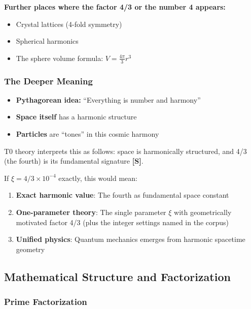 	\textbf{Further places where the factor 4/3 or the number 4 appears:}
	\begin{itemize}
		\item Crystal lattices (4-fold symmetry)
		\item Spherical harmonics
		\item The sphere volume formula: $V = \frac{4\pi}{3}r^3$
	\end{itemize}
	
	\subsubsection{The Deeper Meaning}
	\label{subsubsec:deeper_meaning}
	
	\begin{tcolorbox}[colback=green!5!white,colframe=green!75!black,title=The Pythagorean Interpretation]
		\begin{itemize}
			\item \textbf{Pythagorean idea:} ``Everything is number and harmony''
			\item \textbf{Space itself} has a harmonic structure
			\item \textbf{Particles} are ``tones'' in this cosmic harmony
		\end{itemize}
	\end{tcolorbox}
	
	T0 theory interprets this as follows: space is harmonically structured, and 4/3 (the fourth) is its fundamental signature \textbf{[S]}.
	
	If $\xi = 4/3 \times 10^{-4}$ exactly, this would mean:
	\begin{enumerate}
		\item \textbf{Exact harmonic value}: The fourth as fundamental space constant
		\item \textbf{One-parameter theory}: The single parameter $\xi$ with geometrically motivated factor 4/3 (plus the integer settings named in the corpus)
		\item \textbf{Unified physics}: Quantum mechanics emerges from harmonic spacetime geometry
	\end{enumerate}
	
	\subsection{Mathematical Structure and Factorization}
	\label{subsec:mathematical_structure}
	
	\subsubsection{Prime Factorization}
	\label{subsubsec:prime_factorization}
	
